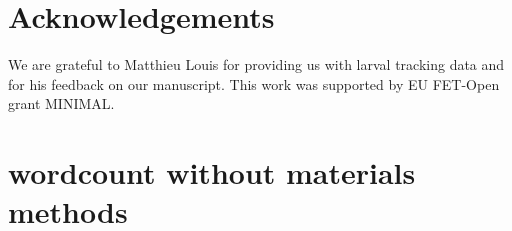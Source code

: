 \documentclass[11pt,a4paper]{article}
\begin{document}
\section{Acknowledgements}
We are grateful to Matthieu Louis for providing us with larval tracking data and for his feedback on our manuscript. This work was supported by EU FET-Open grant MINIMAL.





\clearpage


\section*{wordcount without materials methods}
\newcommand\wordcount{ }
\wordcount
\end{document}
